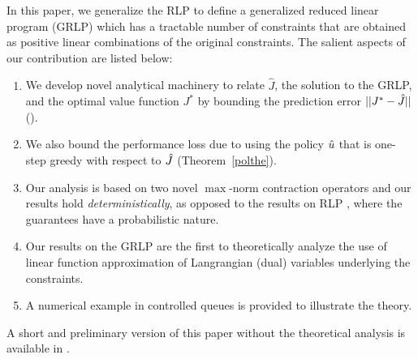 In this paper, we generalize the RLP to define a generalized reduced linear program (GRLP) which has a tractable number of constraints that are obtained as positive linear combinations of the original constraints.
The salient aspects of our contribution are listed below:
\begin{enumerate}
		\item We develop novel analytical machinery to relate $\hat{J}$, the solution to the GRLP, and the optimal value function $J^*$ by bounding the prediction error $||J^*-\hat{J}||$ (). 
		\item We also bound the performance loss due to using the policy $\hat{u}$ that is one-step greedy with respect to $\hat{J}$ (Theorem~\ref{polthe}).
		\item Our analysis is based on two novel $\max$-norm contraction operators and our results hold \emph{deterministically}, as opposed to the results on RLP \cite{SALP,CS}, where the guarantees have a probabilistic nature.
		\item Our results on the GRLP are the first to theoretically analyze the use of linear function approximation of Langrangian (dual) variables underlying the constraints.
		\item A numerical example in controlled queues is provided to illustrate the theory.
\end{enumerate}
A short and preliminary version of this paper without the theoretical analysis is available in \cite{aaaipaper}.
